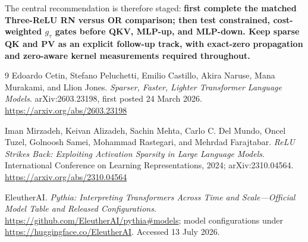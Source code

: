 \documentclass[10pt]{article}
\begin{document}
The central recommendation is therefore staged: \textbf{first complete the matched Three-ReLU RN versus OR comparison; then test constrained, cost-weighted $g_{\tau}$ gates before QKV, MLP-up, and MLP-down. Keep sparse QK and PV as an explicit follow-up track, with exact-zero propagation and zero-aware kernel measurements required throughout.}

\begin{thebibliography}{9}
\small
{}
Edoardo Cetin, Stefano Peluchetti, Emilio Castillo, Akira Naruse, Mana Murakami, and Llion Jones.
\newblock \textit{Sparser, Faster, Lighter Transformer Language Models}.
\newblock arXiv:2603.23198, first posted 24 March 2026. \url{https://arxiv.org/abs/2603.23198}

Iman Mirzadeh, Keivan Alizadeh, Sachin Mehta, Carlo C. Del Mundo, Oncel Tuzel, Golnoosh Samei, Mohammad Rastegari, and Mehrdad Farajtabar.
\newblock \textit{ReLU Strikes Back: Exploiting Activation Sparsity in Large Language Models}.
\newblock International Conference on Learning Representations, 2024; arXiv:2310.04564. \url{https://arxiv.org/abs/2310.04564}

EleutherAI.
\newblock \textit{Pythia: Interpreting Transformers Across Time and Scale---Official Model Table and Released Configurations}.
\newblock \url{https://github.com/EleutherAI/pythia#models}; model configurations under \url{https://huggingface.co/EleutherAI}. Accessed 13 July 2026.
\end{thebibliography}
\end{document}
